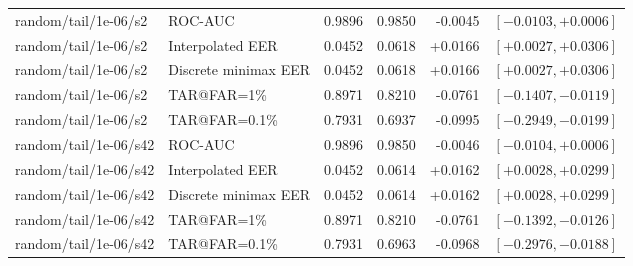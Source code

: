 \begin{table}[!t]
\begin{tabular}{@{}llrrrr@{}}
random/tail/1e-06/s2 & ROC-AUC & 0.9896 & 0.9850 & -0.0045 & $[-0.0103,+0.0006]$ \\
random/tail/1e-06/s2 & Interpolated EER & 0.0452 & 0.0618 & +0.0166 & $[+0.0027,+0.0306]$ \\
random/tail/1e-06/s2 & Discrete minimax EER & 0.0452 & 0.0618 & +0.0166 & $[+0.0027,+0.0306]$ \\
random/tail/1e-06/s2 & TAR@FAR=1\% & 0.8971 & 0.8210 & -0.0761 & $[-0.1407,-0.0119]$ \\
random/tail/1e-06/s2 & TAR@FAR=0.1\% & 0.7931 & 0.6937 & -0.0995 & $[-0.2949,-0.0199]$ \\
random/tail/1e-06/s42 & ROC-AUC & 0.9896 & 0.9850 & -0.0046 & $[-0.0104,+0.0006]$ \\
random/tail/1e-06/s42 & Interpolated EER & 0.0452 & 0.0614 & +0.0162 & $[+0.0028,+0.0299]$ \\
random/tail/1e-06/s42 & Discrete minimax EER & 0.0452 & 0.0614 & +0.0162 & $[+0.0028,+0.0299]$ \\
random/tail/1e-06/s42 & TAR@FAR=1\% & 0.8971 & 0.8210 & -0.0761 & $[-0.1392,-0.0126]$ \\
random/tail/1e-06/s42 & TAR@FAR=0.1\% & 0.7931 & 0.6963 & -0.0968 & $[-0.2976,-0.0188]$ \\
\bottomrule
\end{tabular}
\end{table}
